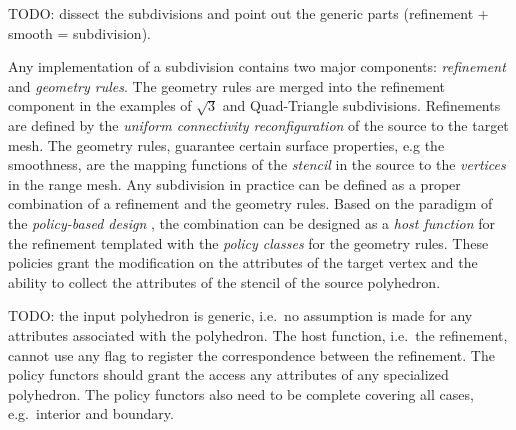 TODO: dissect the subdivisions and point out the generic parts (refinement
+ smooth = subdivision).

Any implementation of a subdivision contains two major
components: \emph{refinement} and \emph{geometry rules}.
The geometry rules are merged into the refinement component
in the examples of $\sqrt{3}$ and Quad-Triangle subdivisions.
Refinements are defined by the 
\emph{uniform connectivity reconfiguration} of the source 
to the target mesh. The geometry rules,
guarantee certain surface properties, e.g the smoothness, are the
mapping functions of the \emph{stencil} in the source to the
\emph{vertices} in the range mesh. Any subdivision in practice can
be defined as a proper combination of a refinement and the
geometry rules. Based on the paradigm of the
\emph{policy-based design} \cite{a-rotm-02}, the combination can be
designed as a \emph{host function} for the refinement
templated with the \emph{policy classes} for the geometry rules.
These policies grant the modification on the attributes of the
target vertex and the ability to collect the attributes of the
stencil of the source polyhedron.

TODO: the input polyhedron is generic, i.e.\ no assumption
is made for any attributes associated with the polyhedron.
The host function, i.e.\ the refinement, cannot use any
flag to register the correspondence between the refinement.
The policy functors should grant the access any attributes
of any specialized polyhedron. The policy functors also
need to be complete covering all cases, e.g.\ interior and
boundary.




